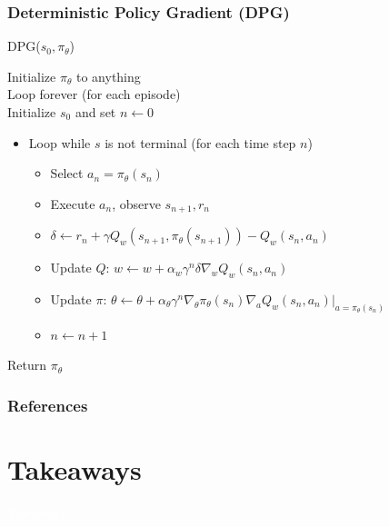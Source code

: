 \documentclass[11pt,table]{beamer}
\begin{document}
\begin{frame}
\frametitle{Deterministic Policy Gradient (DPG)}

\begin{tcolorbox}[colframe=black, boxrule=1pt, sharp corners]

\textcolor{red1}{DPG(\( s_0, \pi_\theta \))}

Initialize \( \pi_\theta \) to anything\\
Loop forever (for each episode)\\
Initialize \( s_0 \) and set \( n \leftarrow 0 \)
\begin{itemize}
    \item[] Loop while \( s \) is not terminal (for each time step \( n \))
    \begin{itemize}
        \item[] Select \( a_n = \pi_\theta(s_n) \)
        \item[] Execute \( a_n \), observe \( s_{n+1}, r_n \)
        \item[] \( \delta \leftarrow r_n + \gamma Q_w\left( s_{n+1}, \pi_\theta(s_{n+1}) \right) - Q_w(s_n, a_n) \)
        \item[] Update \( Q \): \( w \leftarrow w + \alpha_w \gamma^n \delta \nabla_w Q_w(s_n, a_n) \)
        \item[] Update \( \pi \): \( \theta \leftarrow \theta + \alpha_\theta \gamma^n \nabla_\theta \pi_\theta(s_n) \nabla_a Q_w(s_n, a_n) \big|_{a=\pi_\theta(s_n)} \)
        \item[] \( n \leftarrow n + 1 \)
    \end{itemize}
\end{itemize}

Return \( \pi_\theta \)

\end{tcolorbox}

\end{frame}




\begin{frame}[t,allowframebreaks
]\nocite{*}
\frametitle{References}
\small

\end{frame}
\section{Takeaways}
{
\begin{frame}
\centering
\Huge
\textcolor{white}{Takeaways}
\thispagestyle{empty}
\end{frame}
}
\end{document}

